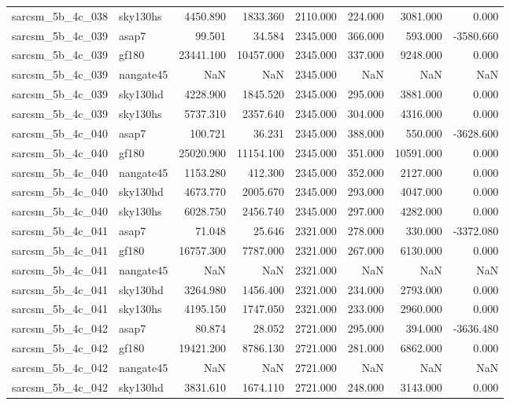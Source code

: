 \begin{tabular}{llrrrrrr}
sarcsm\_5b\_4c\_038 & sky130hs & 4450.890 & 1833.360 & 2110.000 & 224.000 & 3081.000 & 0.000 \\
sarcsm\_5b\_4c\_039 & asap7 & 99.501 & 34.584 & 2345.000 & 366.000 & 593.000 & -3580.660 \\
sarcsm\_5b\_4c\_039 & gf180 & 23441.100 & 10457.000 & 2345.000 & 337.000 & 9248.000 & 0.000 \\
sarcsm\_5b\_4c\_039 & nangate45 & NaN & NaN & 2345.000 & NaN & NaN & NaN \\
sarcsm\_5b\_4c\_039 & sky130hd & 4228.900 & 1845.520 & 2345.000 & 295.000 & 3881.000 & 0.000 \\
sarcsm\_5b\_4c\_039 & sky130hs & 5737.310 & 2357.640 & 2345.000 & 304.000 & 4316.000 & 0.000 \\
sarcsm\_5b\_4c\_040 & asap7 & 100.721 & 36.231 & 2345.000 & 388.000 & 550.000 & -3628.600 \\
sarcsm\_5b\_4c\_040 & gf180 & 25020.900 & 11154.100 & 2345.000 & 351.000 & 10591.000 & 0.000 \\
sarcsm\_5b\_4c\_040 & nangate45 & 1153.280 & 412.300 & 2345.000 & 352.000 & 2127.000 & 0.000 \\
sarcsm\_5b\_4c\_040 & sky130hd & 4673.770 & 2005.670 & 2345.000 & 293.000 & 4047.000 & 0.000 \\
sarcsm\_5b\_4c\_040 & sky130hs & 6028.750 & 2456.740 & 2345.000 & 297.000 & 4282.000 & 0.000 \\
sarcsm\_5b\_4c\_041 & asap7 & 71.048 & 25.646 & 2321.000 & 278.000 & 330.000 & -3372.080 \\
sarcsm\_5b\_4c\_041 & gf180 & 16757.300 & 7787.000 & 2321.000 & 267.000 & 6130.000 & 0.000 \\
sarcsm\_5b\_4c\_041 & nangate45 & NaN & NaN & 2321.000 & NaN & NaN & NaN \\
sarcsm\_5b\_4c\_041 & sky130hd & 3264.980 & 1456.400 & 2321.000 & 234.000 & 2793.000 & 0.000 \\
sarcsm\_5b\_4c\_041 & sky130hs & 4195.150 & 1747.050 & 2321.000 & 233.000 & 2960.000 & 0.000 \\
sarcsm\_5b\_4c\_042 & asap7 & 80.874 & 28.052 & 2721.000 & 295.000 & 394.000 & -3636.480 \\
sarcsm\_5b\_4c\_042 & gf180 & 19421.200 & 8786.130 & 2721.000 & 281.000 & 6862.000 & 0.000 \\
sarcsm\_5b\_4c\_042 & nangate45 & NaN & NaN & 2721.000 & NaN & NaN & NaN \\
sarcsm\_5b\_4c\_042 & sky130hd & 3831.610 & 1674.110 & 2721.000 & 248.000 & 3143.000 & 0.000 \\

\end{tabular}
